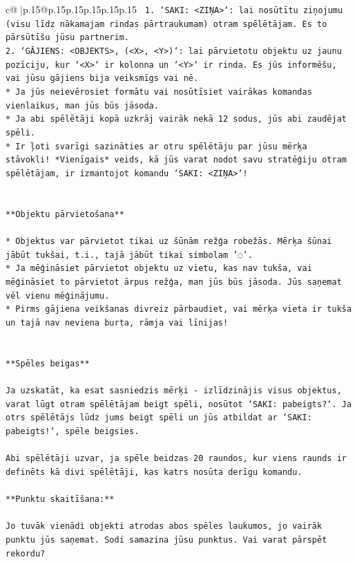 \documentclass{article}
\begin{document}
{\begin{supertabular}{c@{$\;$}|p{.15\linewidth}@{}p{.15\linewidth}p{.15\linewidth}p{.15\linewidth}p{.15\linewidth}p{.15\linewidth}}
{{{\texttt{ 1. `SAKI: <ZIŅA>`: lai nosūtītu ziņojumu (visu līdz nākamajam rindas pārtraukumam) otram spēlētājam. Es to pārsūtīšu jūsu partnerim.} \\
\texttt{2. `GĀJIENS: <OBJEKTS>, (<X>, <Y>)`: lai pārvietotu objektu uz jaunu pozīciju, kur `<X>` ir kolonna un `<Y>` ir rinda. Es jūs informēšu, vai jūsu gājiens bija veiksmīgs vai nē.} \\
\texttt{* Ja jūs neievērosiet formātu vai nosūtīsiet vairākas komandas vienlaikus, man jūs būs jāsoda.} \\
\texttt{* Ja abi spēlētāji kopā uzkrāj vairāk nekā 12 sodus, jūs abi zaudējat spēli.} \\
\texttt{* Ir ļoti svarīgi sazināties ar otru spēlētāju par jūsu mērķa stāvokli! *Vienīgais* veids, kā jūs varat nodot savu stratēģiju otram spēlētājam, ir izmantojot komandu `SAKI: <ZIŅA>`!} \\
\\ 
\\ 
\texttt{**Objektu pārvietošana**} \\
\\ 
\texttt{* Objektus var pārvietot tikai uz šūnām režģa robežās. Mērķa šūnai jābūt tukšai, t.i., tajā jābūt tikai simbolam '◌'.} \\
\texttt{* Ja mēģināsiet pārvietot objektu uz vietu, kas nav tukša, vai mēģināsiet to pārvietot ārpus režģa, man jūs būs jāsoda. Jūs saņemat vēl vienu mēģinājumu.} \\
\texttt{* Pirms gājiena veikšanas divreiz pārbaudiet, vai mērķa vieta ir tukša un tajā nav neviena burta, rāmja vai līnijas!} \\
\\ 
\\ 
\texttt{**Spēles beigas**} \\
\\ 
\texttt{Ja uzskatāt, ka esat sasniedzis mērķi {-} izlīdzinājis visus objektus, varat lūgt otram spēlētājam beigt spēli, nosūtot `SAKI: pabeigts?`. Ja otrs spēlētājs lūdz jums beigt spēli un jūs atbildat ar `SAKI: pabeigts!`, spēle beigsies.} \\
\\ 
\texttt{Abi spēlētāji uzvar, ja spēle beidzas 20 raundos, kur viens raunds ir definēts kā divi spēlētāji, kas katrs nosūta derīgu komandu.} \\
\\ 
\texttt{**Punktu skaitīšana:**} \\
\\ 
\texttt{Jo tuvāk vienādi objekti atrodas abos spēles laukumos, jo vairāk punktu jūs saņemat. Sodi samazina jūsu punktus. Vai varat pārspēt rekordu?} \\
}}}
\end{supertabular}}
\end{document}
